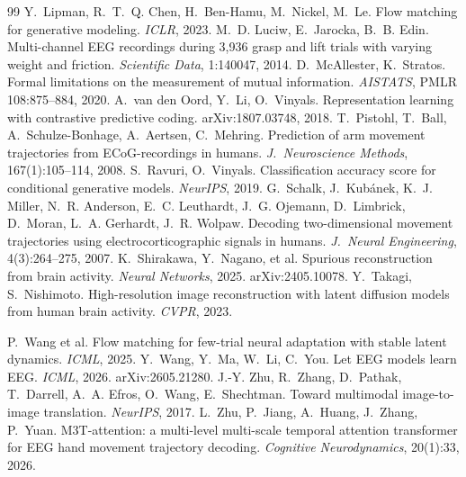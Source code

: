 \documentclass[11pt]{article}
\begin{document}
\begin{thebibliography}{99}
 Y.~Lipman, R.~T.~Q. Chen, H.~Ben-Hamu, M.~Nickel, M.~Le. Flow matching for generative modeling. \emph{ICLR}, 2023.
 M.~D. Luciw, E.~Jarocka, B.~B. Edin. Multi-channel EEG recordings during 3,936 grasp and lift trials with varying weight and friction. \emph{Scientific Data}, 1:140047, 2014.
 D.~McAllester, K.~Stratos. Formal limitations on the measurement of mutual information. \emph{AISTATS}, PMLR 108:875--884, 2020.
 A.~van den Oord, Y.~Li, O.~Vinyals. Representation learning with contrastive predictive coding. arXiv:1807.03748, 2018.
 T.~Pistohl, T.~Ball, A.~Schulze-Bonhage, A.~Aertsen, C.~Mehring. Prediction of arm movement trajectories from ECoG-recordings in humans. \emph{J.\ Neuroscience Methods}, 167(1):105--114, 2008.
 S.~Ravuri, O.~Vinyals. Classification accuracy score for conditional generative models. \emph{NeurIPS}, 2019.
 G.~Schalk, J.~Kub\'anek, K.~J. Miller, N.~R. Anderson, E.~C. Leuthardt, J.~G. Ojemann, D.~Limbrick, D.~Moran, L.~A. Gerhardt, J.~R. Wolpaw. Decoding two-dimensional movement trajectories using electrocorticographic signals in humans. \emph{J.\ Neural Engineering}, 4(3):264--275, 2007.
 K.~Shirakawa, Y.~Nagano, et al. Spurious reconstruction from brain activity. \emph{Neural Networks}, 2025. arXiv:2405.10078.
 Y.~Takagi, S.~Nishimoto. High-resolution image reconstruction with latent diffusion models from human brain activity. \emph{CVPR}, 2023.

 P.~Wang et al. Flow matching for few-trial neural adaptation with stable latent dynamics. \emph{ICML}, 2025.
 Y.~Wang, Y.~Ma, W.~Li, C.~You. Let EEG models learn EEG. \emph{ICML}, 2026. arXiv:2605.21280.
 J.-Y. Zhu, R.~Zhang, D.~Pathak, T.~Darrell, A.~A. Efros, O.~Wang, E.~Shechtman. Toward multimodal image-to-image translation. \emph{NeurIPS}, 2017.
 L.~Zhu, P.~Jiang, A.~Huang, J.~Zhang, P.~Yuan. M3T-attention: a multi-level multi-scale temporal attention transformer for EEG hand movement trajectory decoding. \emph{Cognitive Neurodynamics}, 20(1):33, 2026.
\end{thebibliography}
\end{document}
